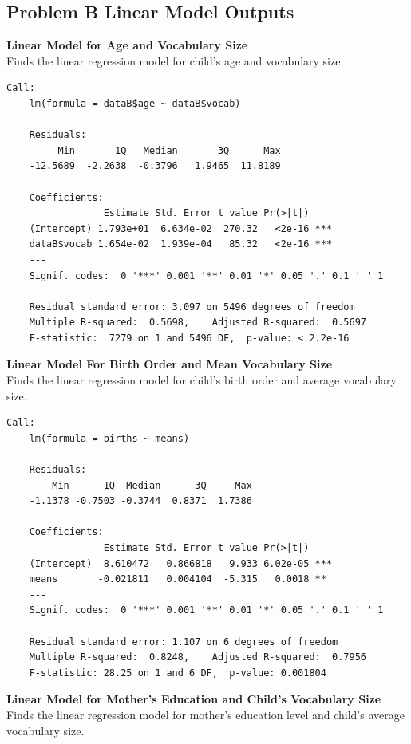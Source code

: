 \documentclass[11pt]{article}  %
\begin{document}
\subsection{Problem B Linear Model Outputs}
\label{sec:lmoutB}
\textbf{Linear Model for Age and Vocabulary Size}\\
Finds the linear regression model for child's age and vocabulary size.
\label{sec:AVlm}
\begin{lstlisting}[basicstyle=\small]
    Call:
    lm(formula = dataB$age ~ dataB$vocab)
    
    Residuals:
         Min       1Q   Median       3Q      Max 
    -12.5689  -2.2638  -0.3796   1.9465  11.8189 
    
    Coefficients:
                 Estimate Std. Error t value Pr(>|t|)    
    (Intercept) 1.793e+01  6.634e-02  270.32   <2e-16 ***
    dataB$vocab 1.654e-02  1.939e-04   85.32   <2e-16 ***
    ---
    Signif. codes:  0 '***' 0.001 '**' 0.01 '*' 0.05 '.' 0.1 ' ' 1
    
    Residual standard error: 3.097 on 5496 degrees of freedom
    Multiple R-squared:  0.5698,	Adjusted R-squared:  0.5697 
    F-statistic:  7279 on 1 and 5496 DF,  p-value: < 2.2e-16
\end{lstlisting}
\textbf{Linear Model For Birth Order and Mean Vocabulary Size}\\
Finds the linear regression model for child's birth order and  average vocabulary size.
\label{sec:BMVlm}
\begin{lstlisting}[basicstyle=\small]
    Call:
    lm(formula = births ~ means)
    
    Residuals:
        Min      1Q  Median      3Q     Max 
    -1.1378 -0.7503 -0.3744  0.8371  1.7386 
    
    Coefficients:
                 Estimate Std. Error t value Pr(>|t|)    
    (Intercept)  8.610472   0.866818   9.933 6.02e-05 ***
    means       -0.021811   0.004104  -5.315   0.0018 ** 
    ---
    Signif. codes:  0 '***' 0.001 '**' 0.01 '*' 0.05 '.' 0.1 ' ' 1
    
    Residual standard error: 1.107 on 6 degrees of freedom
    Multiple R-squared:  0.8248,	Adjusted R-squared:  0.7956 
    F-statistic: 28.25 on 1 and 6 DF,  p-value: 0.001804
\end{lstlisting}
\textbf{Linear Model for Mother's Education and Child's Vocabulary Size}\\
Finds the linear regression model for mother's education level and  child's average vocabulary size.
\label{sec:EMVlm}
\end{document}
